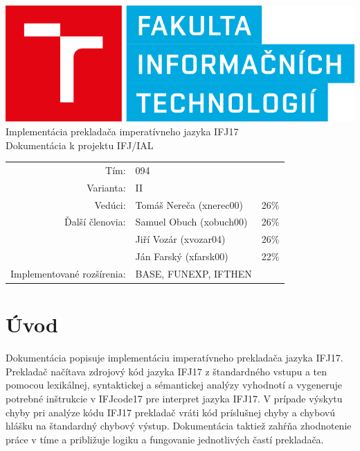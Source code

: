 \documentclass{article}
\begin{document}
    \begin{titlepage}
        \begin{center}
            
            \includegraphics[scale=0.4]{FITlogo.png}\\[30mm]
            
            \LARGE
            Implementácia prekladača imperatívneho jazyka IFJ17 \\
            \large
            Dokumentácia k projektu IFJ/IAL\\[55mm]
            
            \begin{tabular}{r l l}
                Tím: & 094 \\
                Varianta: & II \\
                Vedúci: & Tomáš Nereča (xnerec00) & 26\% \\
                Ďalší členovia: & Samuel Obuch (xobuch00) & 26\% \\
                    & Jiří Vozár (xvozar04) & 26\% \\
                    & Ján Farský (xfarsk00) & 22\% \\
                Implementované rozšírenia: & BASE, FUNEXP, IFTHEN\\
            \end{tabular}
            
        \end{center}
    \end{titlepage}

    \tableofcontents
    \newpage
    
    \section{Úvod}
        Dokumentácia popisuje implementáciu imperatívneho prekladača jazyka IFJ17. Prekladač načítava
        zdrojový kód jazyka IFJ17 z štandardného vstupu a ten pomocou lexikálnej, syntaktickej a sémantickej
        analýzy vyhodnotí a vygeneruje potrebné inštrukcie v IFJcode17 pre interpret jazyka IFJ17. V prípade
        výskytu chyby pri analýze kódu IFJ17 prekladač vráti kód príslušnej chyby a chybovú hlášku na štandardný
        chybový výstup.  Dokumentácia taktiež zahŕňa zhodnotenie práce v tíme a približuje logiku a fungovanie
        jednotlivých častí prekladača. 
\end{document}
